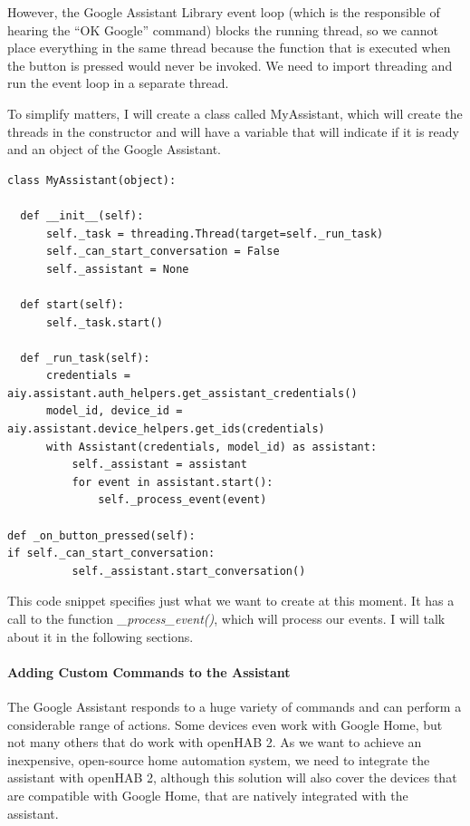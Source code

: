 However, the Google Assistant Library event loop (which is the responsible of hearing the “OK Google” command) blocks the running
thread, so we cannot place everything in the same thread because the function that is executed when the button is pressed would
never be invoked. We need to import threading and run the event loop in a separate thread.

To simplify matters, I will create a class called MyAssistant, which will create the threads in the constructor and will have a
variable that will indicate if it is ready and an object of the Google Assistant.

\begin{lstlisting}[style=PythonCode]
class MyAssistant(object):

  def __init__(self):
      self._task = threading.Thread(target=self._run_task)
      self._can_start_conversation = False
      self._assistant = None

  def start(self):
      self._task.start()

  def _run_task(self):
      credentials = aiy.assistant.auth_helpers.get_assistant_credentials()
      model_id, device_id = aiy.assistant.device_helpers.get_ids(credentials)
      with Assistant(credentials, model_id) as assistant:
          self._assistant = assistant
          for event in assistant.start():
              self._process_event(event)

def _on_button_pressed(self):
if self._can_start_conversation:
          self._assistant.start_conversation()
\end{lstlisting}

This code snippet specifies just what we want to create at this moment. It has a call to the function \textit{\_process\_event()},
which will process our events. I will talk about it in the following sections.

\paragraph{Adding Custom Commands to the Assistant}
The Google Assistant responds to a huge variety of commands and can perform a considerable range of actions. Some devices even
work with Google Home, but not many others that do work with openHAB 2. As we want to achieve an inexpensive, open-source home
automation system, we need to integrate the assistant with openHAB 2, although this solution will also cover the devices that are
compatible with Google Home, that are natively integrated with the assistant.

